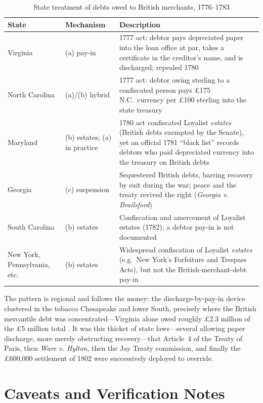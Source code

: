 \documentclass[12pt]{article}
\begin{document}
\begin{table}[htbp]
\centering
\caption{State treatment of debts owed to British merchants, 1776--1783}
\label{tab:states}
\small
\begin{tabular}{p{2.4cm} p{2.2cm} p{8.3cm}}
\toprule
State & Mechanism & Description \\
\midrule
Virginia & (a) pay-in & 1777 act: debtor pays depreciated paper into the loan office at par, takes a certificate in the creditor's name, and is discharged; repealed 1780 \\
North Carolina & (a)/(b) hybrid & 1777 act: debtor owing sterling to a confiscated person pays \pounds175 N.C.\ currency per \pounds100 sterling into the state treasury \\
Maryland & (b) estates; (a) in practice & 1780 act confiscated Loyalist \emph{estates} (British debts exempted by the Senate), yet an official 1781 ``black list'' records debtors who paid depreciated currency into the treasury on British debts \\
Georgia & (c) suspension & Sequestered British debts, barring recovery by suit during the war; peace and the treaty revived the right (\emph{Georgia v. Brailsford}) \\
South Carolina & (b) estates & Confiscation and amercement of Loyalist estates (1782); a debtor pay-in is not documented \\
New York, Pennsylvania, etc. & (b) estates & Widespread confiscation of Loyalist \emph{estates} (e.g.\ New York's Forfeiture and Trespass Acts), but not the British-merchant-debt pay-in \\
\bottomrule
\end{tabular}
\end{table}

The pattern is regional and follows the money: the discharge-by-pay-in device
clustered in the tobacco Chesapeake and lower South, precisely where the British
mercantile debt was concentrated---Virginia alone owed roughly \pounds2.3 million
of the \pounds5 million total \citep{adamson2003british, kellock1974london}. It
was this thicket of state laws---several allowing paper discharge, more merely
obstructing recovery---that Article~4 of the Treaty of Paris, then \emph{Ware v.
Hylton}, then the Jay Treaty commission, and finally the \pounds600{,}000
settlement of 1802 were successively deployed to override.

\section{Caveats and Verification Notes}
\label{sec:caveats}
\end{document}
